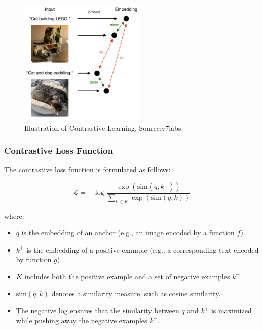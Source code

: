 \begin{figure}[h]
    \centering
    \includegraphics[width=0.55\textwidth]{IMAGES/contrastive_CLIP.png}
    \caption{Illustration of Contrastive Learning. Source:v7labs\footnotemark.}
    \label{fig:contrastive_learning}
\end{figure}
\subsubsection{Contrastive Loss Function}
The contrastive loss function is formulated as follows:

\begin{equation}
\mathcal{L} = -\log \frac{\exp(\text{sim}(q, k^+))}{\sum_{k \in K} \exp(\text{sim}(q, k))}
\end{equation}

where:

\begin{itemize}
    \item \( q \) is the embedding of an anchor (e.g., an image encoded by a function \( f \)).
    \item \( k^+ \) is the embedding of a positive example (e.g., a corresponding text encoded by function \( g \)).
    \item \( K \) includes both the positive example and a set of negative examples \( k^- \).
    \item \( \text{sim}(q, k) \) denotes a similarity measure, such as cosine similarity.
    \item The negative log ensures that the similarity between \( q \) and \( k^+ \) is maximized while pushing away the negative examples \( k^- \).
\end{itemize}